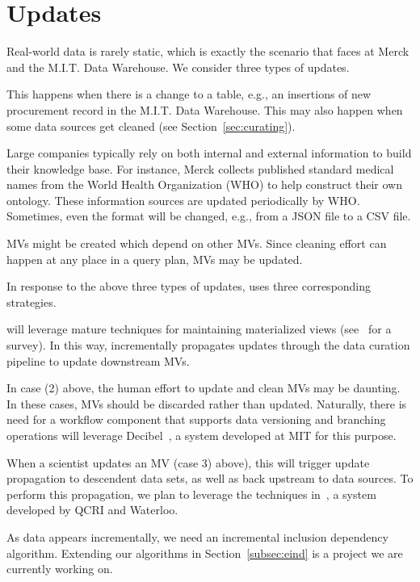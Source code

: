 \section{Updates}
\label{sec:updates}

Real-world data is rarely static, which is exactly the scenario that \dcv faces at Merck and the M.I.T. Data Warehouse.  We consider three types of updates.

 This happens when there is a change to a table, e.g., an insertions of new procurement record in the M.I.T. Data Warehouse. This may also happen when some data sources get cleaned (see Section~\ref{sec:curating}).



 Large companies typically rely on both internal and external information to build their knowledge base. For instance, Merck collects published standard medical names from the World Health Organization (WHO) to help construct their own ontology. These information sources are updated periodically by WHO.  Sometimes, even the format will be changed, e.g., from a JSON file to a CSV file.



 MVs might be created which depend on other MVs.  Since cleaning effort can happen at any place in a query plan, MVs may be updated.



In response to the above three types of updates, \dcv uses three corresponding strategies.



 \dcv will leverage mature techniques for maintaining materialized views (see~\cite{DBLP:journals/debu/GuptaM95} for a survey).  In this way, \dcv incrementally propagates updates through the data curation pipeline to update downstream MVs.




  In case (2) above, the human effort to update and clean MVs may be daunting. In these cases, MVs should be discarded rather than updated. Naturally, there is need for a workflow component that supports data versioning and branching operations \dcv will leverage Decibel~\cite{DBLP:journals/pvldb/MaddoxGEMPD16}, a system developed at MIT for this purpose.




When a scientist updates an MV (case 3) above), this will trigger update propagation to descendent data sets, as well as back upstream to data sources. To perform this propagation, we plan to leverage the techniques in~\cite{DBLP:conf/sigmod/ChalamallaIOP14}, a system developed by QCRI and Waterloo.


As data appears incrementally, we need an incremental inclusion dependency algorithm. Extending our algorithms in Section~\ref{subsec:eind} is a project we are currently working on.

